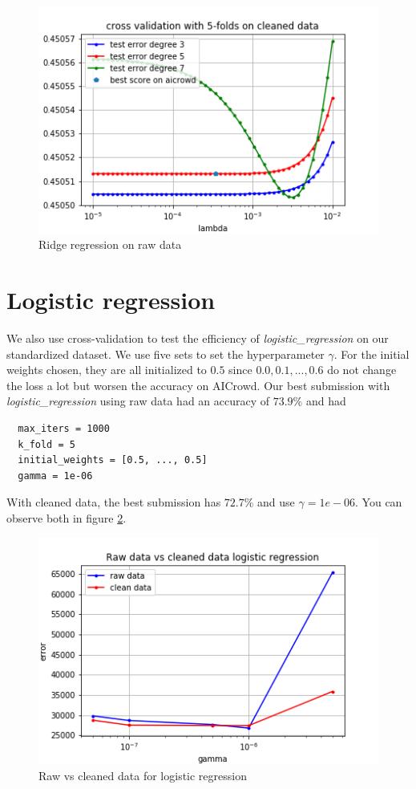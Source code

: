 \documentclass[11pt, a4paper, twocolumn]{article}
\begin{document}
\begin{figure}[h!]
  \includegraphics[width=\linewidth]{plots/ridge_clean.png}
  \caption{Ridge regression on raw data}
  \label{fig:ridge_clean}
\end{figure}

\section{Logistic regression}
We also use cross-validation to test the efficiency of
\textit{logistic\_regression} on our standardized dataset.
We use five sets to set the hyperparameter $\gamma$.
For the initial weights chosen, they are all initialized to $0.5$ since $0.0, 0.1, ..., 0.6$ do not change the loss a lot but worsen the accuracy on AICrowd.
Our best submission with \textit{logistic\_regression} using raw data had an accuracy of $73.9\%$ and had 
\begin{lstlisting}
  max_iters = 1000
  k_fold = 5
  initial_weights = [0.5, ..., 0.5]
  gamma = 1e-06
\end{lstlisting}
With cleaned data, the best submission has $72.7\%$ and use $\gamma = 1e-06$.
You can observe both in figure \ref{fig:raw_clean_log_reg}.

\begin{figure}[h!]
  \includegraphics[width=\linewidth]{raw_vs_clean_log_reg.png}
  \caption{Raw vs cleaned data for logistic regression}
  \label{fig:raw_clean_log_reg}
\end{figure}
\end{document}
